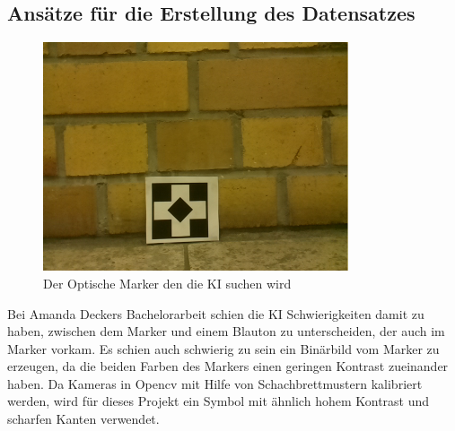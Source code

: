 \documentclass[conference]{IEEEtran}
\begin{document}
\subsection{Ansätze für die Erstellung des Datensatzes}	%
\begin{figure} %
	\centering
	\includegraphics[width=9cm]{img/data1455211246.png}
	\caption{Der Optische Marker den die KI suchen wird }
	\label{Marker}
\end{figure}

Bei Amanda Deckers Bachelorarbeit schien die KI Schwierigkeiten damit zu haben, zwischen dem Marker und einem Blauton zu unterscheiden, der auch im Marker vorkam.
Es schien auch schwierig zu sein ein Binärbild vom Marker zu erzeugen, da die beiden Farben des Markers einen geringen Kontrast zueinander haben.
Da Kameras in Opencv mit Hilfe von Schachbrettmustern kalibriert werden, wird für dieses Projekt ein Symbol mit ähnlich hohem Kontrast und scharfen Kanten verwendet.
\\
\end{document}
